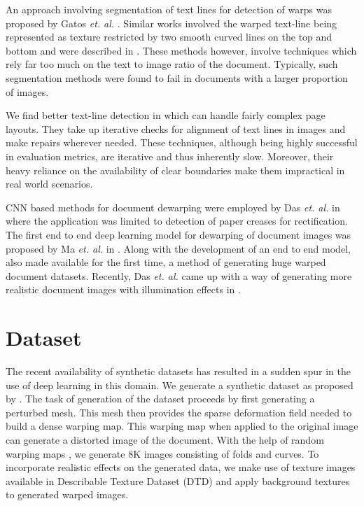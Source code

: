 \documentclass[a4paper,conference]{IEEEtran}
\begin{document}
	
	An approach involving segmentation of text lines for detection of warps was proposed by Gatos \textit{et. al.} \cite{gatos2007segmentation}. Similar works involved the warped text-line being represented as texture restricted by two smooth curved lines on the top and bottom and were described in \cite{chethan2010image,kwon2016method}. These methods however, involve techniques which rely far too much on the text to image ratio of the document. Typically, such segmentation methods were found to fail in documents with a larger proportion of images. 
	
	
	We find better text-line detection in \cite{frinken2011novel, koo2016text} which can handle fairly complex page layouts. They take up iterative checks for alignment of text lines in images and make repairs wherever needed. These techniques, although being highly successful in evaluation metrics, are iterative and thus inherently slow. Moreover, their heavy reliance on the availability of clear boundaries make them impractical in real world scenarios.
	
	CNN based methods for document dewarping were employed by Das \textit{et. al.} in \cite{das2017common} where the application was limited to detection of paper creases for rectification. The first end to end deep learning model for dewarping of document images was proposed by Ma \textit{et. al.} in \cite{Ma-CVPR18}. Along with the development of an end to end model, \cite{Ma-CVPR18} also made available for the first time, a method of generating huge warped document datasets. Recently, Das \textit{et. al.} came up with a way of generating more realistic document images with illumination effects in \cite{das2019dewarpnet}.
	
	\section{Dataset}
	The recent availability of synthetic datasets has resulted in a sudden spur in the use of deep learning in this domain. We generate a synthetic dataset as proposed by \cite{Ma-CVPR18}. The task of generation of the dataset proceeds by first generating a perturbed mesh. This mesh then provides the sparse deformation field needed to build a dense warping map. This warping map when applied to the original image can generate a distorted image of the document. With the help of random warping maps , we generate 8K images consisting of folds and curves.
	To incorporate realistic effects on the generated data, we make use of texture images available in Describable Texture Dataset (DTD) \cite{cimpoi2014describing} and apply background textures to generated warped images. 
	
\end{document}
